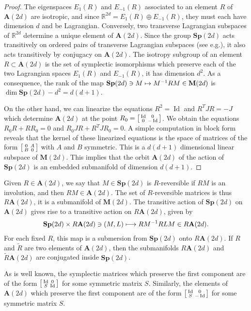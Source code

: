 \documentclass[10pt]{amsart}
\newcommand\mto{\mathchoice{\longmapsto}{\mapsto}{\mapsto}{\mapsto}}
\newenvironment{smallbmatrix}{\big[\begin{smallmatrix}}{\end{smallmatrix}\big]}
\DeclareMathOperator{\Id}{Id}
\newcommand{\Rm}{\mathbb{R}}
\newcommand{\Sp}{\mathbf{Sp}}
\newcommand{\A}{\mathbf{A}}
\newcommand{\M}{\mathbf{M}}
\theoremstyle{plain}
\theoremstyle{definition}
\providecommand{\eg}{e.g.}\providecommand{\ie}{i.e.}\providecommand{\etc}{etc.}\providecommand{\resp}{resp.}\providecommand{\cf}{cf.}
\begin{document}
\begin{proof}
The eigenspaces $E_1(R)$ and $E_{-1}(R)$ associated to
an element $R$ of $\A(2d)$ are isotropic, and since $\Rm^{2d}=E_1(R)\oplus E_{-1}(R)$,
they must each have dimension $d$ and be Lagrangian.
Conversely, two transverse Lagrangian subspaces of $\Rm^{2d}$ determine a unique element of $\A(2d)$. Since the group $\Sp(2d)$ acts transitively on ordered pairs of transverse Lagrangian subspaces
(see \eg \cite[Th.\,1.26]{dG}), it also acts transitively by conjugacy on $\A(2d)$. The isotropy subgroup of an element $R\subset \A(2d)$ is the set of symplectic isomorphisms which preserve each of the two Lagrangian spaces $E_1(R)$ and $E_{-1}(R)$, it has dimension $d^2$. As a consequence, the rank of the map $\Sp(2d)\ni M\mto M^{-1}RM\in \M(2d)$ is $\dim \Sp(2d)-d^2=d(d+1)$.

On the other hand, we can linearize the equations $R^2=\Id$ and $R^TJR=-J$ which determine $\A(2d)$ at the point
$R_0=\begin{smallbmatrix} \Id&0\\0&-\Id\end{smallbmatrix}$.
We obtain the equations $R_0R+RR_0=0$ and $R_0JR+R^TJR_0=0$.
A simple computation in block form reveals that the kernel of these linearized equations is the space of matrices of the form
$\begin{smallbmatrix} 0&A\\B&0\end{smallbmatrix}$ with $A$ and $B$ symmetric.
This is a $d(d+1)$ dimensional linear subspace of $\M(2d)$. This implies that the orbit $\A(2d)$ of the action of $\Sp(2d)$ is an embedded submanifold of dimension $d(d+1)$.
\end{proof}

Given $R\in \A(2d)$, we say that $M\in \Sp(2d)$ is $R$-reversible if $RM$ is an involution, and then $RM\in \A(2d)$. The set of $R$-reversible matrices is thus $R\A(2d)$, it is a submanifold of $\M(2d)$. The transitive action of $\Sp(2d)$ on $\A(2d)$
gives rise to a transitive action on $R\A(2d)$, given by
\[
\Sp(2d)\times R\A(2d) \ni(M, L)\mto RM^{-1}RLM\in R\A(2d).
\]
For each fixed $R$, this map is a submersion from $\Sp(2d)$ onto $R\A(2d)$.
If $R$ and $\tilde R$ are two elements of $\A(2d)$, then the submanifolds $R\A(2d)$ and $\tilde R\A(2d)$ are conjugated inside $\Sp(2d)$.

As is well known, the symplectic matrices which preserve the first component are of the form $\begin{smallbmatrix} \Id&0\\S&\Id\end{smallbmatrix}$ for some symmetric matrix $S$. Similarly,
the elements of $\A(2d)$
which preserve the first component are of the form $\begin{smallbmatrix} \Id&0\\S&-\Id\end{smallbmatrix}$ for some symmetric matrix $S$.
\end{document}
